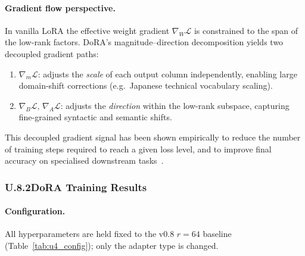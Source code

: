 \documentclass[onecolumn]{article}
\begin{document}
\paragraph{Gradient flow perspective.}
In vanilla LoRA the effective weight gradient $\nabla_{W}\mathcal{L}$
is constrained to the span of the low-rank factors.
DoRA's magnitude--direction decomposition yields two decoupled gradient paths:
\begin{enumerate}[label=(\roman*)]
  \item $\nabla_{m}\mathcal{L}$: adjusts the \emph{scale} of each output column
        independently, enabling large domain-shift corrections
        (e.g.\ Japanese technical vocabulary scaling).
  \item $\nabla_{B}\mathcal{L},\,\nabla_{A}\mathcal{L}$:
        adjusts the \emph{direction} within the low-rank subspace,
        capturing fine-grained syntactic and semantic shifts.
\end{enumerate}
This decoupled gradient signal has been shown empirically to reduce
the number of training steps required to reach a given loss level,
and to improve final accuracy on specialised downstream tasks~\cite{liu2024dora}.

\subsubsection*{U.8.2\enspace DoRA Training Results}

\paragraph{Configuration.}

All hyperparameters are held fixed to the v0.8 $r=64$ baseline
(Table~\ref{tab:u4_config}); only the adapter type is changed.
\end{document}
